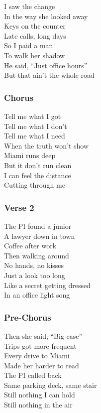\documentclass[]{article}
\begin{document}
I saw the change\\
In the way she looked away\\
Keys on the counter\\
Late calls, long days\\
So I paid a man\\
To walk her shadow\\
He said, ``Just office hours''\\
But that ain't the whole road

\subsubsection{Chorus}\label{chorus-25}

Tell me what I got\\
Tell me what I don't\\
Tell me what I need\\
When the truth won't show\\
Miami runs deep\\
But it don't run clean\\
I can feel the distance\\
Cutting through me

\subsubsection{Verse 2}\label{verse-2-7}

The PI found a junior\\
A lawyer down in town\\
Coffee after work\\
Then walking around\\
No hands, no kisses\\
Just a look too long\\
Like a secret getting dressed\\
In an office light song

\subsubsection{Pre-Chorus}\label{pre-chorus-15}

Then she said, ``Big case''\\
Trips got more frequent\\
Every drive to Miami\\
Made her harder to read\\
The PI called back\\
Same parking deck, same stair\\
Still nothing I can hold\\
Still nothing in the air
\end{document}
